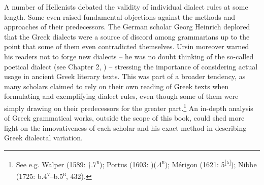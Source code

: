 A number of Hellenists debated the validity of individual dialect rules at some length. Some even raised fundamental objections against the methods and approaches of their predecessors. The German scholar Georg Heinrich \citet[512]{Ursin1691} deplored that the Greek dialects were a source of discord among grammarians up to the point that some of them even contradicted themselves. Ursin moreover warned his readers not to forge new dialects – he was no doubt thinking of the so-called poetical dialect (see Chapter 2, ) – stressing the importance of considering actual usage in ancient Greek literary texts. This was part of a broader tendency, as many scholars claimed to rely on their own reading of Greek texts when formulating and exemplifying dialect rules, even though some of them were simply drawing on their predecessors for the greater part.\footnote{ \textrm{See e.g. Walper (1589: †.7}\textrm{\textsc{\textsuperscript{r}}}\textrm{); Portus (1603: )(.4}\textrm{\textsc{\textsuperscript{r}}}\textrm{); Mérigon (1621: 5}\textrm{\textsc{\textsuperscript{[a]}}}\textrm{); Nibbe (1725: b.4}\textrm{\textsc{\textsuperscript{v}}}\textrm{–b.5}\textrm{\textsc{\textsuperscript{r}}}\textrm{, 432).}} An in-depth analysis of Greek grammatical works, outside the scope of this book, could shed more light on the innovativeness of each scholar and his exact method in describing Greek dialectal variation.


